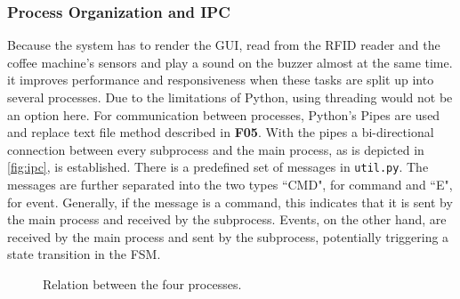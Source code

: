 \documentclass[12pt]{article}
\begin{document}
\subsubsection{Process Organization and IPC}
Because the system has to render the GUI, read from the RFID reader and the coffee machine's sensors and play a sound on the buzzer almost at the same time.
it improves performance and responsiveness when these tasks are split up into several processes.
Due to the limitations of Python, using threading would not be an option here.
For communication between processes, Python's Pipes are used and replace text file method described in \textbf{F05}.
With the pipes a bi-directional connection between every subprocess and the main process, as is depicted in \autoref{fig:ipc}, is established.
There is a predefined set of messages in \texttt{util.py}.
The messages are further separated into the two types ``CMD", for command and ``E", for event.
Generally, if the message is a command, this indicates that it is sent by the main process and received by the subprocess.
Events, on the other hand, are received by the main process and sent by the subprocess, potentially triggering a state transition in the FSM.

\begin{figure}[!h]
  \centering
  \caption{Relation between the four processes.}
  \label{fig:ipc}
\end{figure}
\end{document}
